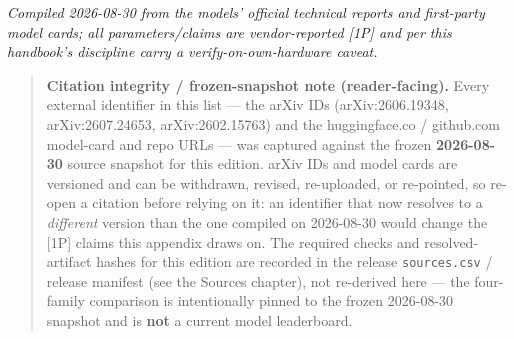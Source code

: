 \emph{Compiled 2026-08-30 from the models' official technical reports
and first-party model cards; all parameters/claims are vendor-reported
\mbox{{[}1P{]}} and per this handbook's discipline carry a
verify-on-own-hardware caveat.}

\begin{quote}
\textbf{Citation integrity / frozen-snapshot note (reader-facing).}
Every external identifier in this list --- the arXiv IDs
(arXiv:2606.19348, arXiv:2607.24653, arXiv:2602.15763) and the
huggingface.co / github.com model-card and repo URLs --- was captured
against the frozen \textbf{2026-08-30} source snapshot for this edition.
arXiv IDs and model cards are versioned and can be withdrawn, revised,
re-uploaded, or re-pointed, so re-open a citation before relying on it:
an identifier that now resolves to a \emph{different} version than the
one compiled on 2026-08-30 would change the \mbox{{[}1P{]}} claims this
appendix draws on. The required checks and resolved-artifact hashes for
this edition are recorded in the release \texttt{sources.csv} / release
manifest (see the Sources chapter), not re-derived here --- the
four-family comparison is intentionally pinned to the frozen 2026-08-30
snapshot and is \textbf{not} a current model leaderboard.
\end{quote}
